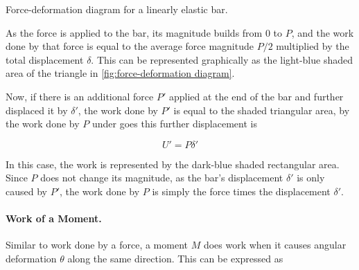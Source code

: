 \documentclass[
fontsize=10pt,
a4paper,
twosides=false,
open=any,
svgnames,
]{kaobook} %
\begin{document}
\begin{marginfigure}
  \centering
  \caption{Force-deformation diagram for a linearly elastic bar.}
  \label{fig:force-deformation diagram}
\end{marginfigure}

As the force is applied to the bar, its magnitude builds from 0 to $P$, and the work done by that force is equal to the average force magnitude $P/2$ multiplied by the total displacement $\delta$. This can be represented graphically as the light-blue shaded area of the triangle in \cref{fig:force-deformation diagram}.

Now, if there is an additional force $P'$ applied at the end of the bar and further displaced it by $\delta'$, the work done by $P'$ is equal to the shaded triangular area, by the work done by $P$ under goes this further displacement is

\begin{equation}
  U' = P \delta'
\end{equation}

In this case, the work is represented by the dark-blue shaded rectangular area. Since $P$ does not change its magnitude, as the bar's displacement $\delta'$ is only caused by $P'$, the work done by $P$ is simply the force times the displacement $\delta'$.

\paragraph{Work of a Moment.}

Similar to work done by a force, a moment $M$ does work when it causes angular deformation $\theta$ along the same direction. This can be expressed as

\begin{figure}[h]
  \centering
\end{figure}
\end{document}
